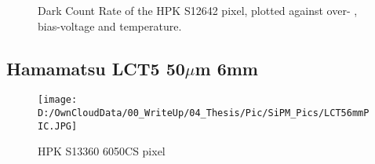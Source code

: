 \documentclass[12pt,article,type=msc,colorback,accentcolor=tud9c]{tudthesis}
\begin{document}
\begin{figure}[h]
\begin{centering}
\caption{Dark Count Rate of the HPK S12642 pixel, plotted against over- , bias-voltage and temperature.}
\label{fig:S12642_OCT}
\end{centering}
\end{figure}
\begin{figure}[h]
\begin{centering}
\caption{}
\label{fig:}
\end{centering}
\end{figure}




\clearpage
\subsection{Hamamatsu LCT5 50$\mu$m 6mm}
\label{subsec:LCT56}
\begin{wrapfigure}{R}{0.4\textwidth}
\centering
\texttt{[image: D:/OwnCloudData/00\_WriteUp/04\_Thesis/Pic/SiPM\_Pics/LCT56mmPIC.JPG]}
\caption{\label{fig:S13360_pixel}HPK S13360 6050CS pixel}
\end{wrapfigure}
\end{document}
